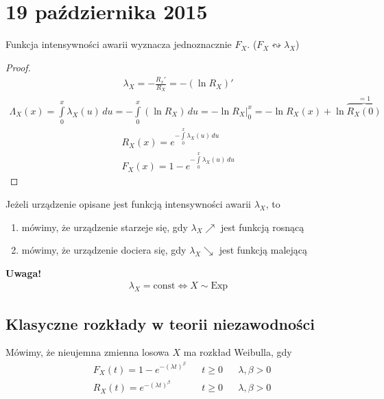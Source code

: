 \chapter{19 października 2015}
\begin{twr}
Funkcja intensywności awarii wyznacza jednoznacznie $ F_X $. ($ F_X\leftrightsquigarrow \lambda_X $)
\end{twr}
\begin{proof}
\begin{gather*}
\lambda_X=-\frac{R_x'}{R_X}=-\left(\ln R_X\right)'
\end{gather*}
\begin{align*}
\Lambda_X(x)
=
\int\limits_{0}^{x}\lambda_X(u)\,du
=
-\int\limits_{0}^{x}\left(\ln R_X\right)\,du
=
\left. -\ln R_X \right|_0^x
=
-\ln R_X(x)+\ln \overset{=1}{\overbrace{R_X(0)}}
\end{align*}
\begin{gather*}
R_X(x)=e^{-\int\limits_{0}^{x}\lambda_X(u)\,du}\\
F_X(x)=1-e^{-\int\limits_{0}^{x}\lambda_X(u)\,du}
\end{gather*}
\end{proof}
  \begin{defi}
Jeżeli urządzenie opisane jest funkcją intensywności awarii $ \lambda_X $, to
\begin{enumerate}
\item mówimy, że urządzenie starzeje się, gdy $ \lambda_X\nearrow $ jest funkcją rosnącą
\item mówimy, że urządzenie dociera się, gdy $ \lambda_X\searrow $ jest funkcją malejącą
\end{enumerate}
\end{defi}
\textbf{Uwaga!}
\begin{gather*}
\lambda_X=\text{const}\Leftrightarrow X\sim \text{Exp}
\end{gather*}
\newpage
\section{Klasyczne rozkłady w teorii niezawodności}
\begin{defi}
Mówimy, że nieujemna zmienna losowa $ X $ ma rozkład Weibulla, gdy
\begin{align*}
&F_X(t)=1-e^{-(\lambda t)^\beta}&&t\ge 0&&\lambda,\beta>0\\
&R_X(t)=e^{-(\lambda t)^\beta}&&t\ge 0&&\lambda,\beta>0
\end{align*}
\end{defi}


